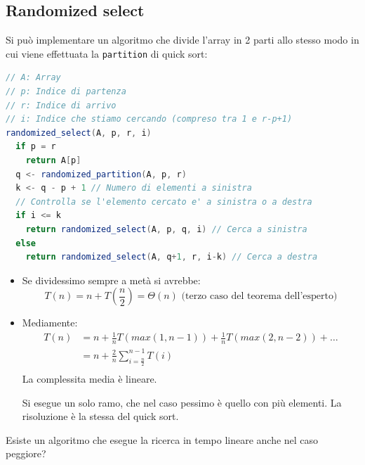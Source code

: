 \documentclass[a4paper]{article}
\begin{document}
\subsection{Randomized select}
Si può implementare un algoritmo che divide l'array in 2 parti allo stesso modo
in cui viene effettuata la \texttt{partition} di quick sort:
\begin{lstlisting}[language=Scala]
// A: Array
// p: Indice di partenza
// r: Indice di arrivo
// i: Indice che stiamo cercando (compreso tra 1 e r-p+1)
randomized_select(A, p, r, i)
  if p = r
    return A[p]
  q <- randomized_partition(A, p, r)
  k <- q - p + 1 // Numero di elementi a sinistra
  // Controlla se l'elemento cercato e' a sinistra o a destra
  if i <= k
    return randomized_select(A, p, q, i) // Cerca a sinistra
  else
    return randomized_select(A, q+1, r, i-k) // Cerca a destra
\end{lstlisting}
\begin{itemize}
  \item
    Se dividessimo sempre a metà si avrebbe:
    \[
      T(n) = n + T\left(\frac{n}{2}\right) = \Theta(n) \text{ (terzo caso del teorema dell'esperto)}
    \]

  \item Mediamente:
    \[
      \begin{aligned}
        T(n) &= n + \frac{1}{n} T \left( max(1,n-1) \right) + \frac{1}{n} T \left( max(2,n-2) \right)
        + \dots\\
             &= n + \frac{2}{n} \sum_{i=\frac{n}{2}}^{n-1} T \left( i \right)\\
      \end{aligned}
    \]
    La complessita media è lineare.

    Si esegue un solo ramo, che nel caso pessimo è quello con più elementi. La risoluzione
    è la stessa del quick sort.
\end{itemize}
Esiste un algoritmo che esegue la ricerca in tempo lineare anche nel caso peggiore?
\end{document}
